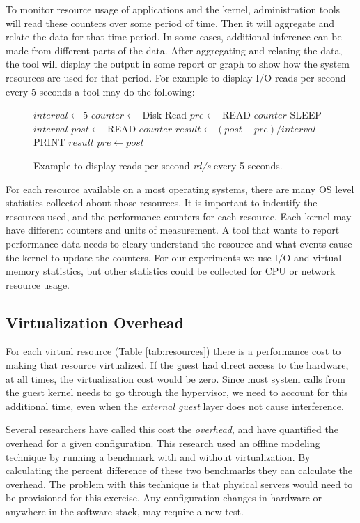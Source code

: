 \indent To monitor resource usage of applications and the kernel, administration tools will read these counters over some period of time.  Then it will aggregate and relate the data for that time period.  In some cases, additional inference can be made from different parts of the data.
After aggregating and relating the data, the tool will display the output in some report or graph to show how the system resources are used for that period.
For example to display I/O reads per second every 5 seconds a tool may do the following:
\begin{figure}[h]
\begin{algorithmic}[H]
 \STATE $interval \gets 5$
 \STATE $counter \gets$  Disk Read
 \STATE $pre \gets $ READ $counter$ 
 \LOOP
    \STATE SLEEP $interval$
    \STATE $post \gets$ READ $counter$
    \STATE $result \gets (post - pre)/interval$
    \STATE PRINT  $result$
    \STATE $pre \gets post$ 
 \ENDLOOP
\end{algorithmic}
\caption{Example to display reads per second \emph{rd/s} every 5 seconds.}
\label{alg1}
\end{figure}

\indent For each resource available on a most operating systems, there are many OS level statistics collected about those resources.  It is important to indentify the resources used, and the performance counters for each resource.  Each kernel may have different counters and units of measurement.  A tool that wants to report performance data needs to cleary understand the resource and what events cause the kernel to update the counters.
For our experiments we use I/O and virtual memory statistics, but other statistics could be collected for CPU or network resource usage.

\subsection{Virtualization Overhead}
For each virtual resource (Table \ref{tab:resources}) there is a performance cost to making that resource virtualized.  If the guest had direct access to the hardware, at all times, the virtualization cost would be zero.  Since most system calls from the guest kernel needs to go through the hypervisor, we need to account for this additional time, even when the \emph{external guest} layer does not cause interference. 

\indent Several researchers \cite{cherkasova, huber1} have called this cost the \emph{overhead}, and have quantified the overhead for a given configuration.  This research used an offline modeling technique by running a benchmark with and without virtualization.  By calculating the percent difference of these two benchmarks they can calculate the overhead.
The problem with this technique is that physical servers would need to be provisioned for this exercise.  Any configuration changes in hardware or anywhere in the software stack, may require a new test.  


